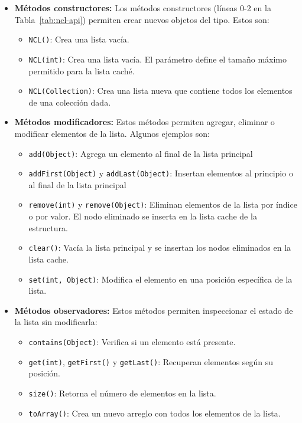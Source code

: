 \begin{itemize}
    \item \textbf{Métodos constructores:}
    Los métodos constructores (líneas 0-2 en la Tabla~\ref{tab:ncl-api}) permiten crear nuevos objetos del tipo. Estos son:
    \begin{itemize}
        \item \texttt{NCL()}: Crea una lista vacía.
        \item \texttt{NCL(int)}: Crea una lista vacía. El parámetro define el
            tamaño máximo permitido para la lista caché.
        \item \texttt{NCL(Collection)}: Crea una lista nueva que contiene todos los elementos de una colección dada.
    \end{itemize}
    \item \textbf{Métodos modificadores:}
    Estos métodos permiten agregar, eliminar o modificar elementos de la lista. Algunos ejemplos son:
    \begin{itemize}
        \item \texttt{add(Object)}: Agrega un elemento al final de la lista
            principal 
        \item \texttt{addFirst(Object)} y \texttt{addLast(Object)}: Insertan elementos al principio o al final de la lista principal 
        \item \texttt{remove(int)} y \texttt{remove(Object)}: Eliminan elementos de la lista por índice o por valor. El nodo eliminado se inserta en la lista cache de la estructura.
        \item \texttt{clear()}: Vacía la lista principal y se insertan los nodos
            eliminados en la lista cache.
        \item \texttt{set(int, Object)}: Modifica el elemento en una posición específica de la lista.
    \end{itemize}
    \item \textbf{Métodos observadores:}  
    Estos métodos permiten inspeccionar el estado de la lista sin modificarla:
    \begin{itemize}
        \item \texttt{contains(Object)}: Verifica si un elemento está presente.
        \item \texttt{get(int)}, \texttt{getFirst()} y \texttt{getLast()}: Recuperan elementos según su posición.
        \item \texttt{size()}: Retorna el número de elementos en la lista.
        \item \texttt{toArray()}: Crea un nuevo arreglo con todos los elementos de la lista.
    \end{itemize}
\end{itemize}


